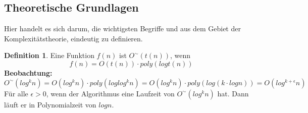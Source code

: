 \documentclass[12pt,oneside]{article}
\theoremstyle{remark}
\theoremstyle{definition}
\newtheorem{definition}{Definition}[section]
\begin{document}

\subsection{Theoretische Grundlagen}

Hier handelt es sich darum, die wichtigsten Begriffe und aus dem Gebiet der Komplexitätstheorie, eindeutig zu definieren.

\begin{definition}
Eine Funktion $f(n)$ ist $ O^{\sim}(t(n))$, wenn
\begin{equation}
    f(n) = O(t(n)) \cdot poly(log t(n))
\end{equation}
\textbf{Beobachtung:}
\begin{equation}
    O^{\sim}(log^k n) = O(log^k n) \cdot poly(log log^k n) = O(log^k n) \cdot poly(log( k \cdot log n)) = O(log^{k+\epsilon}n)
\end{equation}
Für alle $\epsilon > 0$, wenn der Algorithmus eine Laufzeit von $O^{\sim}(log^k n)$ hat. Dann läuft er in Polynomialzeit von $log n$.
\end{definition}

\end{document}
